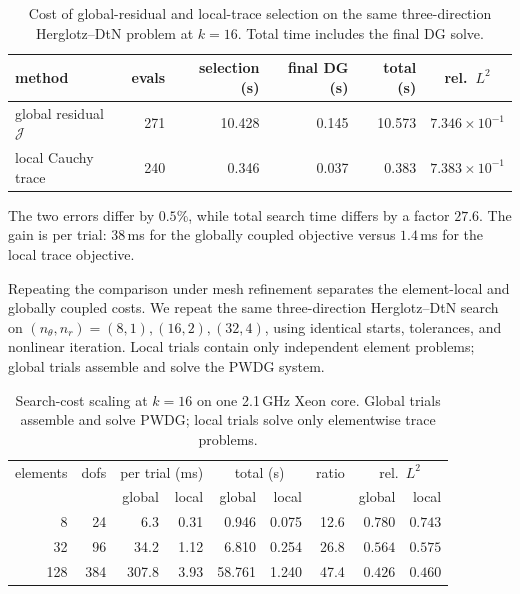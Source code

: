 \documentclass[11pt]{article}
\newcommand{\Jfun}{\mathcal J}
\numberwithin{equation}{section}
\begin{document}
\begin{table}[htbp]
\centering
\caption{Cost of global-residual and local-trace selection on the same three-direction Herglotz--DtN problem at $k=16$.  Total time includes the final DG solve.}
\label{tab:timing}
\footnotesize
\begin{tabular}{lrrrrc}
\toprule
method & evals & selection (s) & final DG (s) & total (s) & rel.\ $L^2$\\
\midrule
global residual $\Jfun$ & 271 & 10.428 & 0.145 & 10.573 & $7.346\times10^{-1}$\\
local Cauchy trace & 240 & 0.346 & 0.037 & 0.383 & $7.383\times10^{-1}$\\
\bottomrule
\end{tabular}
\end{table}

The two errors differ by $0.5\%$, while total search time differs by a factor $27.6$.  The gain is per trial: $38$\,ms for the globally coupled objective versus $1.4$\,ms for the local trace objective.

Repeating the comparison under mesh refinement separates the element-local and globally coupled costs.
We repeat the same three-direction Herglotz--DtN search on $(n_\theta,n_r)=(8,1),(16,2),(32,4)$, using identical starts, tolerances, and nonlinear iteration.  Local trials contain only independent element problems; global trials assemble and solve the PWDG system.

\begin{table}[htbp]
\centering
\caption{Search-cost scaling at $k=16$ on one 2.1\,GHz Xeon core.  Global trials assemble and solve PWDG; local trials solve only elementwise trace problems.}
\label{tab:timing-levels}
\footnotesize
\begin{tabular}{rrrrrrrrr}
\toprule
elements & dofs & \multicolumn{2}{c}{per trial (ms)} & \multicolumn{2}{c}{total (s)} & ratio & \multicolumn{2}{c}{rel.\ $L^2$}\\
 & & global & local & global & local & & global & local\\
\midrule
  8 &  24 &   6.3 & 0.31 &  0.946 & 0.075 & 12.6 & $0.780$ & $0.743$\\
 32 &  96 &  34.2 & 1.12 &  6.810 & 0.254 & 26.8 & $0.564$ & $0.575$\\
128 & 384 & 307.8 & 3.93 & 58.761 & 1.240 & 47.4 & $0.426$ & $0.460$\\
\bottomrule
\end{tabular}
\end{table}
\end{document}
